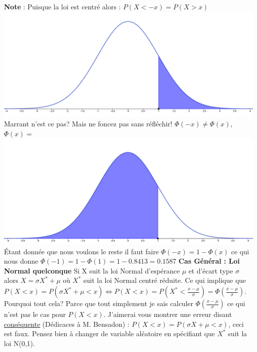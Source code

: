 \documentclass[a4paper]{article}
\begin{document}
\newline
\textbf{Note} : Puisque la loi est centré alors : $P(X<-x) = P(X>x)$
\newline
\includegraphics[scale=0.7]{Graph7.png}
\newline
Marrant n'est ce pas? Mais ne foncez pas sans réfléchir! \underline{$\Phi (-x) \neq \Phi (x)$}, $\Phi (x) =$ \newline
\includegraphics[scale=0.7]{Graph8.png}
\newline
Étant donnée que nous voulons le reste il faut faire $\Phi (-x) = 1 - \Phi (x)$ ce qui nous donne $\Phi (-1) = 1 - \Phi (1) = 1 - 0.8413 = 0.1587$
\newline
\textbf{Cas Général : Loi Normal quelconque}
\newline
Si X suit la loi Normal d'espérance $\mu$ et d'écart type $\sigma$ alors $X = \sigma X^* + \mu$ où $X^*$ suit la loi Normal centré réduite. Ce qui implique que $P(X<x) = P(\sigma X^* + \mu < x) \Leftrightarrow P(X<x) = P(X^* < \frac{x - \mu}{\sigma}) = \Phi (\frac{x - \mu}{\sigma})$. Pourquoi tout cela? Parce que tout simplement je sais calculer $\Phi (\frac{x - \mu}{\sigma})$ ce qui n'est pas le cas pour $P(X<x)$. J'aimerai vous montrer une erreur disant \underline{conséquente} (Dédicaces à M. Bensadon) : $P(X<x) = P(\sigma X + \mu < x)$, ceci est faux. Pensez bien à changer de variable aléatoire en spécifiant que $X^*$ suit la loi N(0,1).
\end{document}
